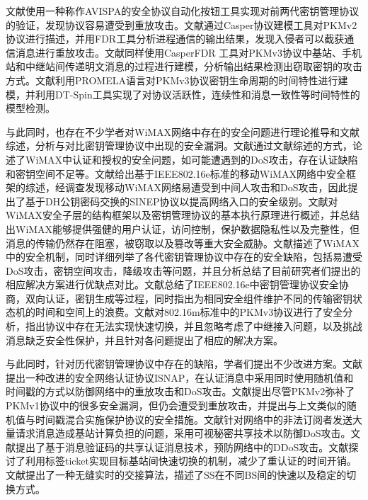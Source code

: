   文献\cite{Rai2011An}使用一种称作AVISPA的安全协议自动化按钮工具实现对前两代密钥管理协议的验证，发现协议容易遭受到重放攻击。文献\cite{Xu2008Modeling}通过Casper协议建模工具对PKMv2协议进行描述，并用FDR工具分析进程通信的输出结果，发现入侵者可以截获通信消息进行重放攻击。文献\cite{Raju2010Formal}同样使用CasperFDR 工具对PKMv3协议中基站、手机站和中继站间传递明文消息的过程进行建模，分析输出结果检测出窃取密钥的攻击方式。文献\cite{Zhu2015Formal}利用PROMELA语言对PKMv3协议密钥生命周期的时间特性进行建模，并利用DT-Spin工具实现了对协议活跃性，连续性和消息一致性等时间特性的模型检测。

     与此同时，也存在不少学者对WiMAX网络中存在的安全问题进行理论推导和文献综述，分析与对比密钥管理协议中出现的安全漏洞。文献\cite{sikkens2008security}通过文献综述的方式，论述了WiMAX中认证和授权的安全问题，如可能遭遇到的DoS攻击，存在认证缺陷和密钥空间不足等。文献\cite{han2008analysis}给出基于IEEE802.16e标准的移动WiMAX网络中安全框架的综述，经调查发现移动WiMAX网络易遭受到中间人攻击和DoS攻击，因此提出了基于DH公钥密码交换的SINEP协议以提高网络入口的安全级别。文献\cite{Bogdanoski2008IEEE}对WiMAX安全子层的结构框架以及密钥管理协议的基本执行原理进行概述，并总结出WiMAX能够提供强健的用户认证，访问控制，保护数据隐私性以及完整性，但消息的传输仍然存在阻塞，被窃取以及篡改等重大安全威胁。文献\cite{Tshering2011A}描述了WiMAX中的安全机制，同时详细列举了各代密钥管理协议中存在的安全缺陷，包括易遭受DoS攻击，密钥空间攻击，降级攻击等问题，并且分析总结了目前研究者们提出的相应解决方案进行优缺点对比。文献\cite{Tian2007Key}总结了IEEE802.16e中密钥管理协议安全协商，双向认证，密钥生成等过程，同时指出为相同安全组件维护不同的传输密钥状态机的时间和空间上的浪费。文献\cite{杨玖宏2012IEEE802}对802.16m标准中的PKMv3协议进行了安全分析，指出协议中存在无法实现快速切换，并且忽略考虑了中继接入问题，以及挑战消息缺乏安全性保护，并且针对各问题提出了相应的解决方案。

与此同时，针对历代密钥管理协议中存在的缺陷，学者们提出不少改进方案。文献\cite{Hashmi2009Improved}提出一种改进的安全网络认证协议ISNAP，在认证消息中采用同时使用随机值和时间戳的方式以防御网络中的重放攻击和DoS攻击。文献\cite{Altaf2008Security}提出尽管PKMv2弥补了PKMv1协议中的很多安全漏洞，但仍会遭受到重放攻击，并提出与上文类似的随机值与时间戳混合实施保护协议的安全措施。文献\cite{Altaf2008A}针对网络中的非法订阅者发送大量请求消息造成基站计算负担的问题，采用可视秘密共享技术以防御DoS攻击。文献\cite{Kim2008Shared}提出了基于消息验证码的共享认证消息技术，预防网络中的DDoS攻击。文献\cite{Fu2010A}探讨了利用标签ticket实现目标基站间快速切换的机制，减少了重认证的时间开销。文献\cite{Shrestha2009Seamless}提出了一种无缝实时的交接算法，描述了SS在不同BS间的快速以及稳定的切换方式。

